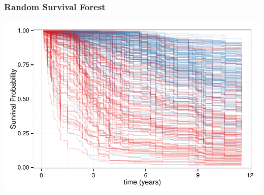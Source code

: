 \documentclass[xcolor=svgnames]{beamer}\usepackage[]{graphicx}\usepackage[]{color}
\newenvironment{knitrout}{}{} %
\begin{document}
\begin{frame}
\frametitle{Random Survival Forest}

\begin{knitrout}\footnotesize
{}\color{fgcolor}

{\centering \includegraphics[width=.9\linewidth]{figures/pbc-forest-1} 

}



\end{knitrout}
\end{frame}
\end{document}
